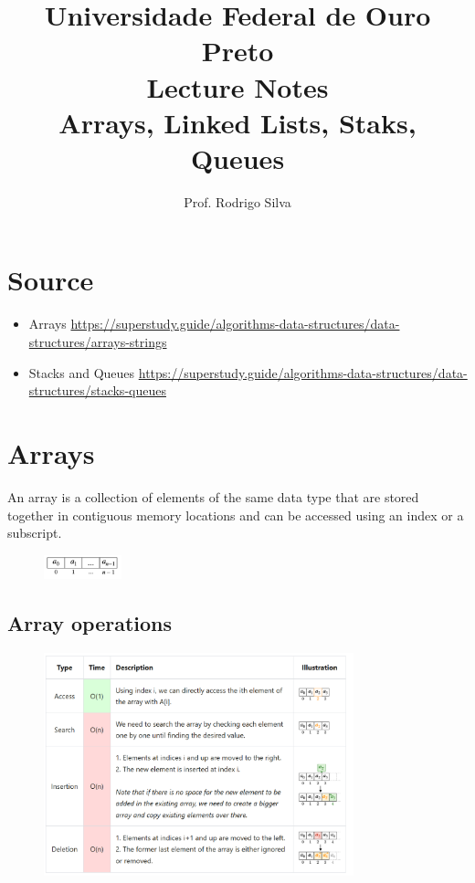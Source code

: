 \documentclass{article}
\title{\vspace{-2 cm}Universidade Federal de Ouro Preto \\ Lecture Notes \\ Arrays, Linked Lists, Staks, Queues}
\author{Prof. Rodrigo Silva}
\begin{document}
\maketitle

\section*{Source}

\begin{itemize}
    \item Arrays \url{https://superstudy.guide/algorithms-data-structures/data-structures/arrays-strings}
    \item Stacks and Queues \url{https://superstudy.guide/algorithms-data-structures/data-structures/stacks-queues}
\end{itemize}

\section{Arrays}

An array is a collection of elements of the same data type that are stored together in contiguous memory locations and can be accessed using an index or a subscript.

\begin{figure}[!ht]
    \centering
    \includegraphics*[width=0.2\textwidth]{images/array.png}
\end{figure}

\subsection{Array operations}

\begin{figure}[!ht]
    \centering
    \includegraphics*[width=0.8\textwidth]{images/array_operations.png}
\end{figure}
\end{document}
